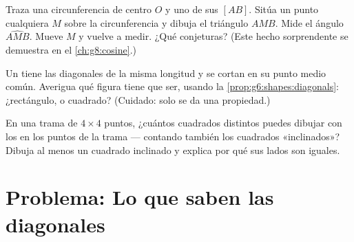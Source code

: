 \begin{exercise}[$\star\star$]\label{exo:g6:shapes:10}
Traza una circunferencia de centro $O$ y uno de sus  $[AB]$. Sitúa un
punto cualquiera $M$ sobre la circunferencia y dibuja el triángulo $AMB$. Mide el ángulo
$\widehat{AMB}$. Mueve $M$ y vuelve a medir. ¿Qué conjeturas?
(Este hecho sorprendente se demuestra en el \cref{ch:g8:cosine}.)
\end{exercise}

\begin{exercise}[$\star\star$]\label{exo:g6:shapes:11}
Un  tiene las diagonales de la misma longitud y se cortan en
su punto medio común. Averigua qué figura tiene que ser, usando la
\cref{prop:g6:shapes:diagonals}: ¿rectángulo,  o cuadrado?
(Cuidado: solo se da una propiedad.)
\end{exercise}

\begin{exercise}[$\star\star\star$]\label{exo:g6:shapes:12}
En una trama de $4 \times 4$ puntos, ¿cuántos cuadrados distintos puedes dibujar
con los  en los puntos de la trama --- contando también los cuadrados «inclinados»?
Dibuja al menos un cuadrado inclinado y explica por qué sus lados son iguales.
\end{exercise}

\section{Problema: Lo que saben las diagonales}

